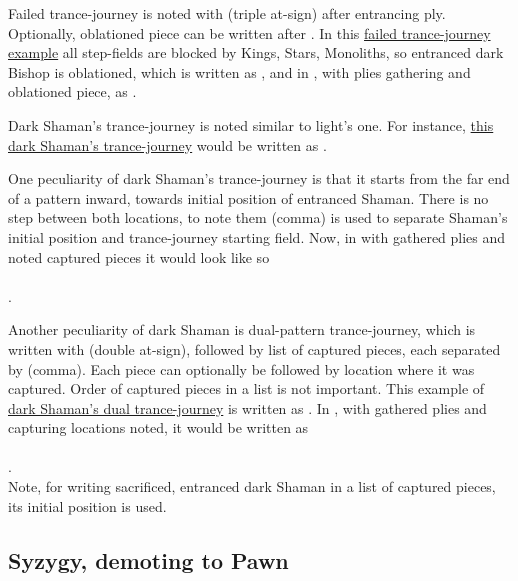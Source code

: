 Failed trance-journey is noted with  (triple at-sign) after entrancing ply. Optionally, oblationed
piece can be written after . In this
\hyperref[fig:scn_o_21_trance_journey_failed]{failed trance-journey example} all step-fields are blocked by
Kings, Stars, Monoliths, so entranced dark Bishop is oblationed, which is written as ,
and in , with plies gathering and oblationed piece, as .

Dark Shaman's trance-journey is noted similar to light's one. For instance,
\hyperref[fig:scn_cot_22_dark_dark_shaman_interaction_start]{this dark Shaman's trance-journey} would be
written as .

One peculiarity of dark Shaman's trance-journey is that it starts from the far end of a pattern inward,
towards initial position of entranced Shaman. There is no step between both locations, to note them \alg{,}
(comma) is used to separate Shaman's initial position and trance-journey starting field. Now, in 
with gathered plies and noted captured pieces it would look like so\\
\\
\alg{[He12,w18..q16*P..k14*N..c18]}.

Another peculiarity of dark Shaman is dual-pattern trance-journey, which is written with  (double at-sign),
followed by list of captured pieces, each separated by \alg{,} (comma). Each piece can optionally be followed by
location where it was captured. Order of captured pieces in a list is not important. This example of
\hyperref[fig:scn_cot_24_dark_dark_shaman_double_interaction_start]{dark Shaman's dual trance-journey} is written as
. In , with gathered plies and capturing locations noted, it would be
written as\\
\\
.\\
Note, for writing sacrificed, entranced dark Shaman in a list of captured pieces, its initial position is used.

\subsection*{Syzygy, demoting to Pawn}
\label{sec:Appendix/Notation/Syzygy, demoting to Pawn}

